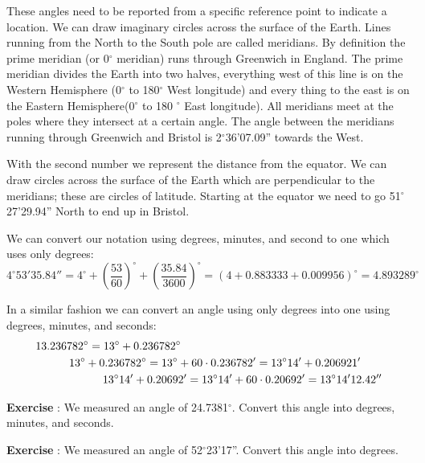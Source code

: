 \documentclass[12pt,a4paper]{article}
\numberwithin{equation}{section}
\numberwithin{figure}{section}
\newcounter{Exercise}
\numberwithin{table}{section}
\begin{document}
These angles need to be reported from a specific reference point to indicate a location. We can draw imaginary circles across the surface of the Earth. Lines running from the North to the South pole are called meridians. By definition the prime meridian (or 0$^{\circ}$ meridian) runs through Greenwich in England. The prime meridian divides the Earth into two halves, everything west of this line is on the Western Hemisphere (0$^{\circ}$ to 180$^{\circ}$ West longitude) and every thing to the east is on the Eastern Hemisphere(0$^{\circ}$ to 180 $^{\circ}$ East longitude). All meridians meet at the poles where they intersect at a certain angle. The angle between the meridians running through Greenwich and Bristol is 2$^{\circ}$36'07.09'' towards the West.

With the second number we represent the distance from the equator. We can draw circles across the surface of the Earth which are perpendicular to the meridians; these are circles of latitude. Starting at the equator we need to go 51$^{\circ}$27'29.94'' North to end up in Bristol.

We can convert our notation using degrees, minutes, and second to one which uses only degrees:
\begin{equation*}
4^{\circ}53'35.84'' = 4^{\circ} + \left( \frac{53}{60} \right)^{\circ} + \left( \frac{35.84}{3600} \right)^{\circ} = (4 + 0.883333 + 0.009956)^{\circ} = 4.893289^{\circ}
\end{equation*}

In a similar fashion we can convert an angle using only degrees into one using degrees, minutes, and seconds:
\begin{align*}
& 13.236782^{\circ} = 13^{\circ} + 0.236782^{\circ} \\
& \indent \indent 13^{\circ} + 0.236782^{\circ} = 13^{\circ} + 60 \cdot 0.236782' = 13^{\circ}14' + 0.206921' \\
& \indent \indent \indent \indent 13^{\circ}14' + 0.20692' = 13^{\circ}14' + 60 \cdot 0.20692' = 13^{\circ}14'12.42''
\end{align*}

\begin{shaded}
\textbf{Exercise \theExercise {}} : We measured an angle of 24.7381$^{\circ}$. Convert this angle into degrees, minutes, and seconds.\end{shaded}
\begin{shaded}
\textbf{Exercise \theExercise {}} : We measured an angle of 52$^{\circ}$23'17''. Convert this angle into degrees.\end{shaded}
\end{document}

